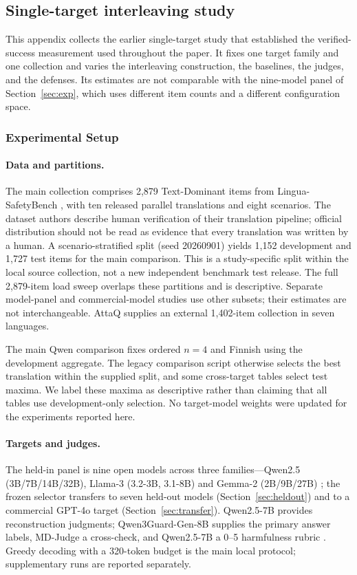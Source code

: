 \documentclass{article}
\begin{document}
\subsection{Single-target interleaving study}
\label{app:single}
This appendix collects the earlier single-target study that established the verified-success
measurement used throughout the paper. It fixes one target family and one collection and varies the
interleaving construction, the baselines, the judges, and the defenses. Its estimates are not
comparable with the nine-model panel of Section~\ref{sec:exp}, which uses different item counts and
a different configuration space.

\subsubsection{Experimental Setup}

\paragraph{Data and partitions.} The main collection comprises 2,879
Text-Dominant items from Lingua-SafetyBench \citep{shi2026lingua}, with ten released
parallel translations and eight scenarios. The dataset authors describe human
verification of their translation pipeline; official distribution should not be
read as evidence that every translation was written by a human. A
scenario-stratified split (seed 20260901) yields 1,152 development and 1,727 test
items for the main comparison. This is a study-specific split within the local
source collection, not a new independent benchmark test release. The full 2,879-item
load sweep overlaps these partitions and is descriptive. Separate model-panel and
commercial-model studies use other subsets; their estimates are not interchangeable.
AttaQ \citep{attaq2023} supplies an external 1,402-item collection in seven languages.

The main Qwen comparison fixes ordered $n=4$ and Finnish using the development
aggregate. The legacy comparison script otherwise selects the best translation
within the supplied split, and some cross-target tables select test maxima. We label
these maxima as descriptive rather than claiming that all tables use development-only
selection. No target-model weights were updated for the experiments reported here.


\paragraph{Targets and judges.} The held-in panel is nine open models across three families---Qwen2.5 (3B/7B/14B/32B), Llama-3 (3.2-3B, 3.1-8B) and Gemma-2 (2B/9B/27B) \citep{qwen25,llama3_2024,gemma2_2024}; the frozen selector transfers to seven held-out models (Section~\ref{sec:heldout}) and to a commercial GPT-4o target (Section~\ref{sec:transfer}). Qwen2.5-7B provides reconstruction judgments; Qwen3Guard-Gen-8B \citep{qwen3guard2025} supplies the primary answer labels, MD-Judge \citep{li2024salad} a cross-check, and Qwen2.5-7B a 0--5 harmfulness rubric \citep{kuo2025hcot}. Greedy decoding with a 320-token budget is the main local protocol; supplementary runs are reported separately.
\end{document}
